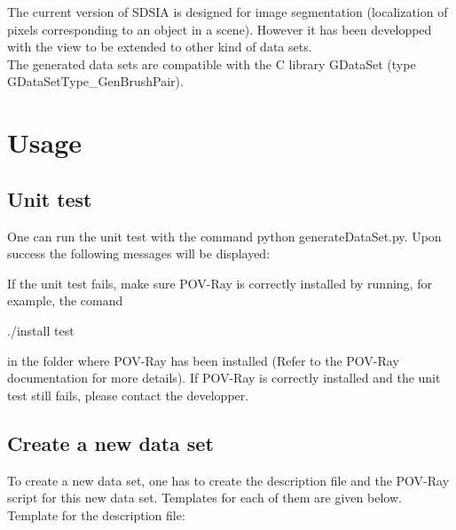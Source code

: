The current version of SDSIA is designed for image segmentation (localization of pixels corresponding to an object in a scene). However it has been developped with the view to be extended to other kind of data sets.\\

The generated data sets are compatible with the C library GDataSet (type GDataSetType\_GenBrushPair).\\

\section{Usage}

\subsection{Unit test}

One can run the unit test with the command python generateDataSet.py. Upon success the following messages will be displayed:

\begin{scriptsize}
\begin{ttfamily}

\end{ttfamily}
\end{scriptsize}

If the unit test fails, make sure POV-Ray is correctly installed by running, for example, the comand \begin{ttfamily}./install test\end{ttfamily} in the folder where POV-Ray has been installed (Refer to the POV-Ray documentation for more details). If POV-Ray is correctly installed and the unit test still fails, please contact the developper.

\subsection{Create a new data set}

To create a new data set, one has to create the description file and the POV-Ray script for this new data set. Templates for each of them are given below.\\
 
Template for the description file:\\
\begin{scriptsize}
\begin{ttfamily}

\end{ttfamily}
\end{scriptsize}

